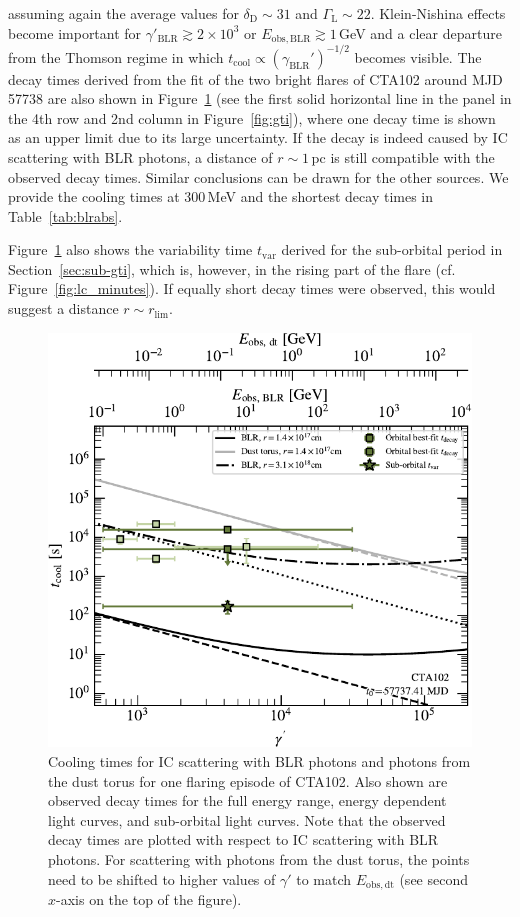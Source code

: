 \documentclass[twocolumn,linenumbers]{aastex62}
\begin{document}
assuming again the average values for $\delta_\mathrm{D}\sim31$ and $\Gamma_\mathrm{L}\sim22$. 
Klein-Nishina effects become important for $\gamma'_\mathrm{BLR} \gtrsim 2\times10^3$ or $E_\mathrm{obs,BLR}\gtrsim1\,$GeV and a clear departure from the Thomson regime in which 
$t_\mathrm{cool}\propto(\gamma_\mathrm{BLR}')^{-1/2}$
becomes visible.
The decay times derived from the fit of the two bright flares of CTA102 around MJD 57738 are also shown in Figure~\ref{fig:tcool}
(see the first solid horizontal line in the panel in the 4th row and 2nd column in Figure~\ref{fig:gti}), where one decay time is shown as an upper limit due to its large uncertainty. 
If the decay is indeed caused by IC scattering with BLR photons, a distance of $r\sim1\,$pc is still compatible with the observed decay times. 
Similar conclusions can be drawn for the other sources. 
We provide the cooling times at 300\,MeV and the shortest decay times in Table~\ref{tab:blrabs}.

Figure~\ref{fig:tcool} also shows the variability time $t_\mathrm{var}$ derived for the sub-orbital period in Section~\ref{sec:sub-gti}, which is, however, in the rising part of the flare (cf. Figure~\ref{fig:lc_minutes}). If equally short decay times were observed, this would suggest a distance $r \sim r_\mathrm{lim}$. 

\begin{figure}
    \centering
    \includegraphics[width = .9\linewidth]{tcool_CTA102_t001_LogParabola_ring.pdf}
    \caption{Cooling times for IC scattering with BLR photons and photons from the dust torus for one flaring episode of CTA102. Also shown are observed decay times for the full energy range, energy dependent light curves, and sub-orbital light curves.
    Note that the observed decay times are plotted with respect to IC scattering with BLR photons. For scattering with photons from the dust torus, the points need to be shifted to higher values of $\gamma'$ to match $E_\mathrm{obs,dt}$ (see second $x$-axis on the top of the figure).}
    \label{fig:tcool}
\end{figure}
\end{document}
